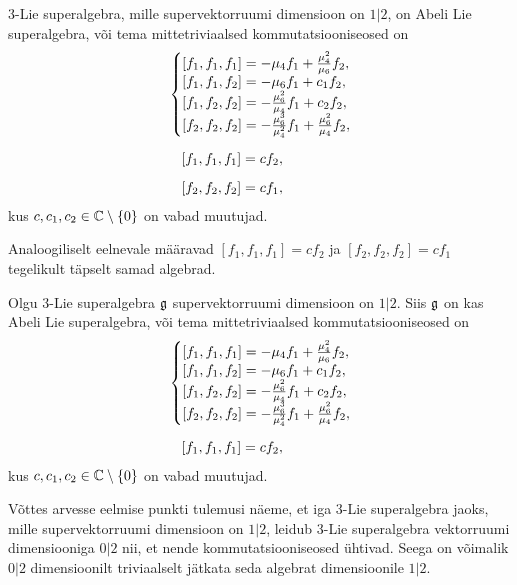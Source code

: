 \begin{lau}
    $3$-Lie superalgebra, mille supervektorruumi dimensioon on $1|2$, on Abeli
    Lie superalgebra, või tema mittetriviaalsed kommutatsiooniseosed on
    \renewcommand\arraystretch{1.2}
    \begin{align}
        & \left\{
            \begin{matrix*}[l]
                [f_1, f_1, f_1] = -\m_4 f_1 + \frac{\m_4^2}{\m_6} f_2, \\
                [f_1, f_1, f_2] = -\m_6 f_1 + c_1 f_2, \\
                [f_1, f_2, f_2] = -\frac{\m_6^2}{\m_4} f_1 + c_2 f_2, \\
                [f_2, f_2, f_2] = -\frac{\m_6^3}{\m_4^2} f_1 +
                    \frac{\m_6^2}{\m_4} f_2, \\
            \end{matrix*}
        \right. \\[0.2cm]
        &\ \ \ [f_1, f_1, f_1] = c f_2, \\[0.2cm]
        &\ \ \ [f_2, f_2, f_2] = c f_1,
    \end{align}
    \renewcommand\arraystretch{1}
    kus $c, c_1, c_2 \in \mathbb{C} \setminus \{ 0 \}$ on vabad muutujad.
\end{lau}

Analoogiliselt eelnevale määravad $[f_1, f_1, f_1] = c f_2$ ja
$[f_2, f_2, f_2] = c f_1$ tegelikult täpselt samad algebrad.

\begin{thm}
    Olgu $3$-Lie superalgebra $\mathfrak{g}$ supervektorruumi dimensioon on $1|2$.
    Siis $\mathfrak{g}$ on kas Abeli Lie superalgebra, või tema mittetriviaalsed
    kommutatsiooniseosed on
    \renewcommand\arraystretch{1.2}
    \begin{align}
        & \left\{
            \begin{matrix*}[l]
                [f_1, f_1, f_1] = -\m_4 f_1 + \frac{\m_4^2}{\m_6} f_2, \\
                [f_1, f_1, f_2] = -\m_6 f_1 + c_1 f_2, \\
                [f_1, f_2, f_2] = -\frac{\m_6^2}{\m_4} f_1 + c_2 f_2, \\
                [f_2, f_2, f_2] = -\frac{\m_6^3}{\m_4^2} f_1 +
                    \frac{\m_6^2}{\m_4} f_2, \\
            \end{matrix*}
        \right. \\[0.2cm]
        &\ \ \ [f_1, f_1, f_1] = c f_2,
    \end{align}
    \renewcommand\arraystretch{1}
    kus $c, c_1, c_2 \in \mathbb{C} \setminus \{ 0 \}$ on vabad muutujad.
\end{thm}

Võttes arvesse eelmise punkti tulemusi näeme, et iga $3$-Lie superalgebra
jaoks, mille supervektorruumi dimensioon on $1|2$, leidub
$3$-Lie superalgebra vektorruumi dimensiooniga $0|2$ nii, et nende
kommutatsiooniseosed ühtivad. Seega on võimalik $0|2$ dimensioonilt
triviaalselt jätkata seda algebrat dimensioonile $1|2$.
